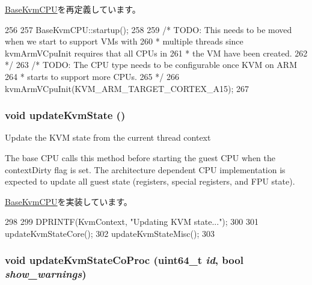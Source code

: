 \hyperlink{classBaseKvmCPU_aecc7d8debf54990ffeaaed5bac7d7d81}{BaseKvmCPU}を再定義しています。


\begin{DoxyCode}
256 {
257     BaseKvmCPU::startup();
258 
259     /* TODO: This needs to be moved when we start to support VMs with
260      * multiple threads since kvmArmVCpuInit requires that all CPUs in
261      * the VM have been created.
262      */
263     /* TODO: The CPU type needs to be configurable once KVM on ARM
264      * starts to support more CPUs.
265      */
266     kvmArmVCpuInit(KVM_ARM_TARGET_CORTEX_A15);
267 }
\end{DoxyCode}
\hypertarget{classArmKvmCPU_a93c6e8c82dfb63c7039f0cbf064fae5d}{
\subsubsection[{updateKvmState}]{\setlength{\rightskip}{0pt plus 5cm}void updateKvmState ()}}
\label{classArmKvmCPU_a93c6e8c82dfb63c7039f0cbf064fae5d}
Update the KVM state from the current thread context

The base CPU calls this method before starting the guest CPU when the contextDirty flag is set. The architecture dependent CPU implementation is expected to update all guest state (registers, special registers, and FPU state). 

\hyperlink{classBaseKvmCPU_a48817be7bf03ef44cc5114ecf4df9b27}{BaseKvmCPU}を実装しています。


\begin{DoxyCode}
298 {
299     DPRINTF(KvmContext, "Updating KVM state...\n");
300 
301     updateKvmStateCore();
302     updateKvmStateMisc();
303 }
\end{DoxyCode}
\hypertarget{classArmKvmCPU_a2647fd1f3839c4716dcec7ccfb567c33}{
\subsubsection[{updateKvmStateCoProc}]{\setlength{\rightskip}{0pt plus 5cm}void updateKvmStateCoProc (uint64\_\-t {\em id}, \/  bool {\em show\_\-warnings})}}
\label{classArmKvmCPU_a2647fd1f3839c4716dcec7ccfb567c33}



